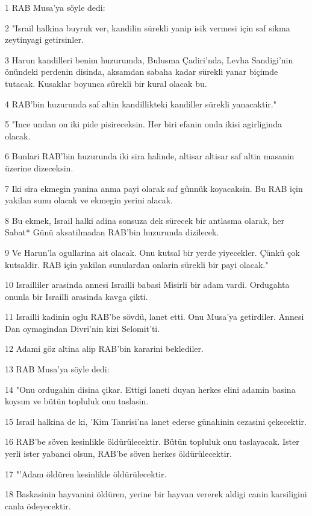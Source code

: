 \par 1 RAB Musa'ya söyle dedi:
\par 2 "Israil halkina buyruk ver, kandilin sürekli yanip isik vermesi için saf sikma zeytinyagi getirsinler.
\par 3 Harun kandilleri benim huzurumda, Bulusma Çadiri'nda, Levha Sandigi'nin önündeki perdenin disinda, aksamdan sabaha kadar sürekli yanar biçimde tutacak. Kusaklar boyunca sürekli bir kural olacak bu.
\par 4 RAB'bin huzurunda saf altin kandillikteki kandiller sürekli yanacaktir."
\par 5 "Ince undan on iki pide pisireceksin. Her biri efanin onda ikisi agirliginda olacak.
\par 6 Bunlari RAB'bin huzurunda iki sira halinde, altisar altisar saf altin masanin üzerine dizeceksin.
\par 7 Iki sira ekmegin yanina anma payi olarak saf günnük koyacaksin. Bu RAB için yakilan sunu olacak ve ekmegin yerini alacak.
\par 8 Bu ekmek, Israil halki adina sonsuza dek sürecek bir antlasma olarak, her Sabat* Günü aksatilmadan RAB'bin huzurunda dizilecek.
\par 9 Ve Harun'la ogullarina ait olacak. Onu kutsal bir yerde yiyecekler. Çünkü çok kutsaldir. RAB için yakilan sunulardan onlarin sürekli bir payi olacak."
\par 10 Israilliler arasinda annesi Israilli babasi Misirli bir adam vardi. Ordugahta onunla bir Israilli arasinda kavga çikti.
\par 11 Israilli kadinin oglu RAB'be sövdü, lanet etti. Onu Musa'ya getirdiler. Annesi Dan oymagindan Divri'nin kizi Selomit'ti.
\par 12 Adami göz altina alip RAB'bin kararini beklediler.
\par 13 RAB Musa'ya söyle dedi:
\par 14 "Onu ordugahin disina çikar. Ettigi laneti duyan herkes elini adamin basina koysun ve bütün topluluk onu taslasin.
\par 15 Israil halkina de ki, 'Kim Tanrisi'na lanet ederse günahinin cezasini çekecektir.
\par 16 RAB'be söven kesinlikle öldürülecektir. Bütün topluluk onu taslayacak. Ister yerli ister yabanci olsun, RAB'be söven herkes öldürülecektir.
\par 17 "'Adam öldüren kesinlikle öldürülecektir.
\par 18 Baskasinin hayvanini öldüren, yerine bir hayvan vererek aldigi canin karsiligini canla ödeyecektir.
